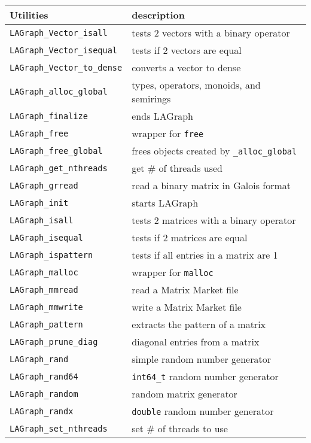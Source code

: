 \documentclass[12pt]{article}
\begin{document}
\vspace{0.1in}
{\small
\begin{tabular}{ll}
\hline
\hline
Utilities & description \\
\hline
\hline
\verb'LAGraph_Vector_isall'     & tests 2 vectors with a binary operator \\
\verb'LAGraph_Vector_isequal'   & tests if 2 vectors are equal \\
\verb'LAGraph_Vector_to_dense'  & converts a vector to dense \\
\verb'LAGraph_alloc_global'     & types, operators, monoids, and semirings \\
\verb'LAGraph_finalize'         & ends LAGraph \\
\verb'LAGraph_free'             & wrapper for \verb'free' \\
\verb'LAGraph_free_global'      & frees objects created by \verb'_alloc_global'\\
\verb'LAGraph_get_nthreads'     & get \# of threads used \\
\verb'LAGraph_grread'           & read a binary matrix in Galois format \\
\verb'LAGraph_init'             & starts LAGraph \\
\verb'LAGraph_isall'            & tests 2 matrices with a binary operator \\
\verb'LAGraph_isequal'          & tests if 2 matrices are equal \\
\verb'LAGraph_ispattern'        & tests if all entries in a matrix are 1 \\
\verb'LAGraph_malloc'           & wrapper for \verb'malloc' \\
\verb'LAGraph_mmread'           & read a Matrix Market file \\
\verb'LAGraph_mmwrite'          & write a Matrix Market file \\
\verb'LAGraph_pattern'          & extracts the pattern of a matrix \\
\verb'LAGraph_prune_diag'       & diagonal entries from a matrix \\
\verb'LAGraph_rand'             & simple random number generator \\
\verb'LAGraph_rand64'           & \verb'int64_t' random number generator \\
\verb'LAGraph_random'           & random matrix generator \\
\verb'LAGraph_randx'            & \verb'double' random number generator \\
\verb'LAGraph_set_nthreads'     & set \# of threads to use \\

\end{tabular}}
\end{document}
